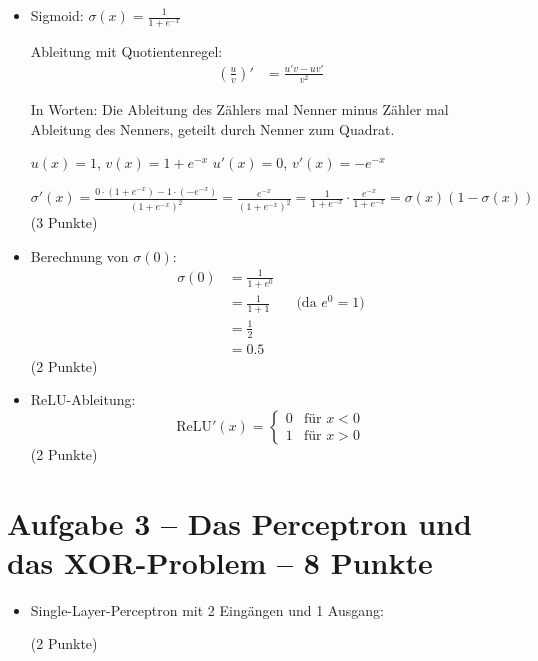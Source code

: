 \begin{itemize}
\item [a)] Sigmoid: $\sigma(x) = \frac{1}{1 + e^{-x}}$

Ableitung mit Quotientenregel:
\begin{align*}
\left(\frac{u}{v}\right)' &= \frac{u'v - uv'}{v^2}
\end{align*}

In Worten: Die Ableitung des Zählers mal Nenner minus Zähler mal Ableitung des Nenners, geteilt durch Nenner zum Quadrat.

$u(x) = 1$, $v(x) = 1 + e^{-x}$
$u'(x) = 0$, $v'(x) = -e^{-x}$

$\sigma'(x) = \frac{0 \cdot (1 + e^{-x}) - 1 \cdot (-e^{-x})}{(1 + e^{-x})^2} = \frac{e^{-x}}{(1 + e^{-x})^2} = \frac{1}{1 + e^{-x}} \cdot \frac{e^{-x}}{1 + e^{-x}} = \sigma(x)(1 - \sigma(x))$
(3 Punkte)
\end{itemize}

\begin{itemize}
\item [b)] Berechnung von $\sigma(0)$:
\begin{align*}
\sigma(0) &= \frac{1}{1 + e^{0}} \\
&= \frac{1}{1 + 1} && \text{(da } e^0 = 1\text{)} \\
&= \frac{1}{2} \\
&= 0.5
\end{align*}
(2 Punkte)
\end{itemize}

\begin{itemize}
\item [c)] ReLU-Ableitung:
\[
\text{ReLU}'(x) = \begin{cases} 0 & \text{für } x < 0 \\ 1 & \text{für } x > 0 \end{cases}
\]
(2 Punkte)
\end{itemize}

\newpage

\section*{Aufgabe 3 -- Das Perceptron und das XOR-Problem -- 8 Punkte}

\begin{itemize}
\item [a)] Single-Layer-Perceptron mit 2 Eingängen und 1 Ausgang:
\begin{center}
\end{center}
(2 Punkte)
\end{itemize}

